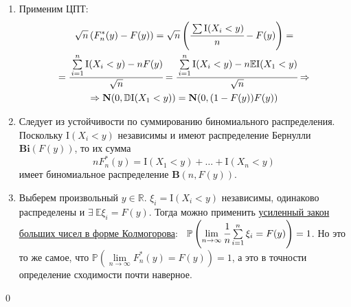 \documentclass[oneside,final,14pt]{extreport}
\renewenvironment{proof}{{\bfseries Доказательство.}}{\qed}
\theoremstyle{plain}
\theoremstyle{definition}
\newtheorem*{rmrk}{Замечание}
\theoremstyle{named}
\begin{document}
\begin{proof}
\begin{enumerate}
\begin{enumerate}[label={\arabic*)}]
        \begin{rmrk}
        Пользуясь полученной оценкой на дисперсию и неравенством Чебышёва, можно показать, что эмпирическая функция распределения сходится к истинной по вероятности:
        $$ \mathbb{P}\left(|F_n^*(y) - F(y)| \geqslant \varepsilon \right) ~\leqslant~ \cfrac{\mathbb{D}F_n^*(y)}{\varepsilon^2} ~\leqslant~ \cfrac{1}{4n\varepsilon^2} \xrightarrow[n \to \infty]{} 0 ~~\forall~y \in \mathbb{R}.
        $$
        Заметим так же, что ввиду 5-го свойства это замечание бесполезно.
        \end{rmrk}
    \end{enumerate}
    \item Применим ЦПТ:
    \begin{multline*}
        \sqrt{n}\left(F_{n}^{*}(y)-F(y)\right)
        = \sqrt{n}\left(\cfrac{\sum \mathrm{I}(X_{i}<y)}{n}-F(y)\right) 
        = \\
        = \cfrac{\sum\limits_{i=1}^{n} \mathrm{I}(X_{i}<y)-n F(y)}{\sqrt{n}} 
        = \cfrac{\sum\limits_{i=1}^{n} \mathrm{I}(X_{i}<y)-n \mathbb{E}\mathrm{I}(X_{1}<y)}{\sqrt{n}} 
        \Rightarrow \\
        \Rightarrow \mathbf{N}(0, \mathbb{D}\mathrm{I}(X_{1}<y))
        = \mathbf{N}(0, (1-F(y))F(y))
    \end{multline*}
    \item Следует из устойчивости по суммированию биномиального распределения. Поскольку $\mathrm{I}\left(X_{i}<y\right)$ независимы и имеют распределение Бернулли $\mathbf{Bi}(F(y))$, то их сумма
    \begin{equation*}
        n F_{n}^{*}(y)=\mathrm{I}\left(X_{1}<y\right)+\ldots+\mathrm{I}\left(X_{n}<y\right)
    \end{equation*}
    имеет биномиальное распределение $\mathbf{B}(n, F(y))$.
    
    \item Выберем произвольный $y \in \mathbb{R}$. $\xi_i = \mathrm{I}(X_i < y)$ независимы, одинаково распределены и $\exists~\mathbb{E} \xi_i = F(y)$. Тогда можно применить \hyperlink{SLLN}{усиленный закон больших чисел в форме Колмогорова}:~ ${\mathbb{P}\left(\lim\limits_{n \to \infty} \cfrac{1}{n} \sum\limits_{i = 1}^{n}\xi_i = F(y)\right) = 1}$. Но это то же самое, что $\mathbb{P}\left({\lim\limits_{n \to \infty} F_n^*(y) = F(y)}\right) = 1$, а это в точности определение сходимости почти наверное.
\end{enumerate}  
\end{proof}
\end{document}
